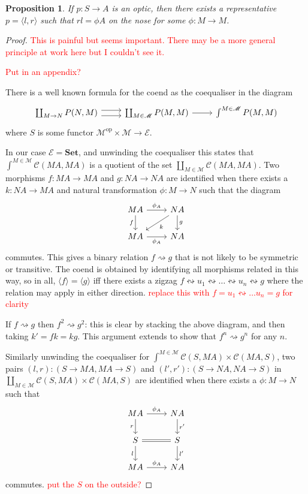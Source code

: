 \documentclass[11pt,a4paper]{article}
\theoremstyle{plain}
\newtheorem{proposition}[theorem]{Proposition}
\theoremstyle{definition}
\newcommand{\C}{\mathscr{C}}
\newcommand{\E}{\mathscr{E}}
\newcommand{\M}{\mathscr{M}}
\newcommand{\Set}{\mathbf{Set}}
\newcommand{\op}{\mathrm{op}}
\newcommand{\todo}[1]{\textcolor{red}{\small #1}}
\begin{document}
\begin{proposition}
\label{prop-onthenose}
If $p : S \to A$ is an optic, then there exists a representative $p = \langle l, r \rangle$ such that $rl = \phi A$ on the nose for some $\phi : M \to M$.
\end{proposition}
\begin{proof}
\todo{This is painful but seems important. There may be a more general principle at work here but I couldn't see it.}

\todo{Put in an appendix?}

There is a well known formula for the coend as the coequaliser in the diagram
\[
\begin{tikzcd}
\coprod_{M \to N} P(N, M) \ar[r,shift left=.75ex]  \ar[r,shift right=.75ex] & \coprod_{M \in \M} P(M, M) \ar[r] & \int^{M \in \M} P(M, M)
\end{tikzcd}
\]
where $S$ is some functor $\M^\op \times \M \to \E$.

In our case $\E = \Set$, and unwinding the coequaliser this states that $\int^{M \in \M} \C(M A, M A)$ is a quotient of the set $\coprod_{M \in \M} \C(M A, M A)$. Two morphisms $f : M A \to M A$ and $g : N A \to N A$ are identified when there exists a $k : N A \to M A$ and natural transformation $\phi : M \to N$ such that the diagram
\[
\begin{tikzcd}
M A \ar[r, "\phi_A"] \ar[d, "f", swap] & N A \ar[d, "g"] \ar[dl, "k"] \\
M A \ar[r, "\phi_A", swap] & N A
\end{tikzcd}
\]
commutes. This gives a binary relation $f \rightsquigarrow g$ that is not likely to be symmetric or transitive. The coend is obtained by identifying all morphisms related in this way, so in all, $\langle f \rangle = \langle g \rangle$ iff there exists a zigzag $f \leftrightsquigarrow u_1 \leftrightsquigarrow \dots \leftrightsquigarrow u_n \leftrightsquigarrow g$ where the relation may apply in either direction. \todo{replace this with $f = u_1 \leftrightsquigarrow \dots u_n = g$ for clarity}

If $f \rightsquigarrow g$ then $f^2 \rightsquigarrow g^2$: this is clear by stacking the above diagram, and then taking $k' = fk = kg$. This argument extends to show that $f^n \rightsquigarrow g^n$ for any $n$.

Similarly unwinding the coequaliser for $\int^{M \in \M} \C(S, M A) \times \C(M A, S)$, two pairs $(l, r) : (S \to M A, MA \to S)$ and $(l', r') : (S \to NA, NA \to S)$ in $\coprod_{M \in \M} \C(S, M A) \times \C(M A, S)$ are identified when there exists a $\phi : M \to N$ such that
\[
\begin{tikzcd}
M A \ar[r, "\phi_A"] \ar[d, "r", swap] & N A \ar[d, "r'"] \\
S \ar[r, equal] \ar[d, "l", swap] & S \ar[d, "l'"]  \\
MA \ar[r, "\phi_A"] & N A
\end{tikzcd}
\]
commutes. \todo{put the $S$ on the outside?}


\end{proof}
\end{document}
